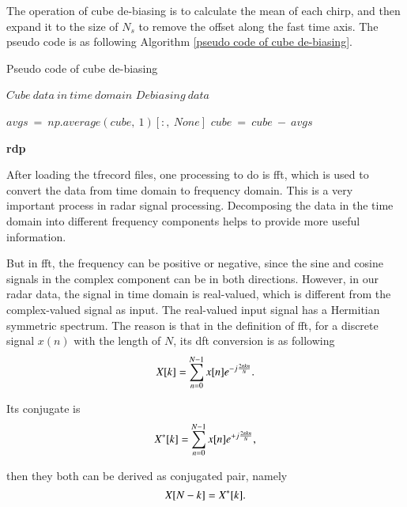 The operation of cube de-biasing is to calculate the mean of each chirp, and then expand it to the size of $N_s$ to remove the offset along the fast time axis. The pseudo code is as following Algorithm \ref{pseudo code of cube de-biasing}.
\begin{algorithm}
    \caption{Pseudo code of cube de-biasing}
    \label{pseudo code of cube de-biasing}
    \renewcommand{\algorithmicrequire}{\textbf{Input:}}
    \renewcommand{\algorithmicensure}{\textbf{Output:}}
    
    \begin{algorithmic}[1]
        \REQUIRE $Cube\ data\ in\ time\ domain$
        \ENSURE $Debiasing\ data$

        \STATE $avgs\ =\ np.average(cube,\ 1)[:,\ None]$
        \STATE $cube\ =\ cube\ -\ avgs$
        
    \end{algorithmic}
\end{algorithm}

\begin{spacing}{1.5}
\textbf{\large{\gls{rdp}}}
\end{spacing}

After loading the \gls{tfrecord} files, one processing to do is \gls{fft}, which is used to convert the data from time domain to frequency domain. This is a very important process in radar signal processing. Decomposing the data in the time domain into different frequency components helps to provide more useful information.

But in \gls{fft}, the frequency can be positive or negative, since the sine and cosine signals in the complex component can be in both directions. However, in our radar data, the signal in time domain is real-valued, which is different from the complex-valued signal as input. The real-valued input signal has a Hermitian symmetric spectrum. The reason is that in the definition of \gls{fft}, for a discrete signal $x(n)$ with the length of $N$, its \gls{dft} conversion is as following
\begin{equation}
    \centering
    X[k] = \sum_{n=0}^{N-1} x[n] e^{-j\frac{2\pi kn}{N}}.
\end{equation}

Its conjugate is
\begin{equation}
    \centering
    X^*[k] = \sum_{n=0}^{N-1} x[n] e^{+j\frac{2\pi kn}{N}},
\end{equation}

then they both can be derived as conjugated pair, namely
\begin{equation}
    \centering
    X[N - k] = X^*[k].
\end{equation}

